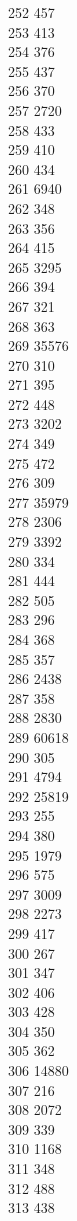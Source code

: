 { 252	457 \\
 253	413 \\
 254	376 \\
 255	437 \\
 256	370 \\
 257	2720 \\
 258	433 \\
 259	410 \\
 260	434 \\
 261	6940 \\
 262	348 \\
 263	356 \\
 264	415 \\
 265	3295 \\
 266	394 \\
 267	321 \\
 268	363 \\
 269	35576 \\
 270	310 \\
 271	395 \\
 272	448 \\
 273	3202 \\
 274	349 \\
 275	472 \\
 276	309 \\
 277	35979 \\
 278	2306 \\
 279	3392 \\
 280	334 \\
 281	444 \\
 282	505 \\
 283	296 \\
 284	368 \\
 285	357 \\
 286	2438 \\
 287	358 \\
 288	2830 \\
 289	60618 \\
 290	305 \\
 291	4794 \\
 292	25819 \\
 293	255 \\
 294	380 \\
 295	1979 \\
 296	575 \\
 297	3009 \\
 298	2273 \\
 299	417 \\
 300	267 \\
 301	347 \\
 302	406 \\
 303	428 \\
 304	350 \\
 305	362 \\
 306	14880 \\
 307	216 \\
 308	2072 \\
 309	339 \\
 310	1168 \\
 311	348 \\
 312	488 \\
 313	438 \\
}
